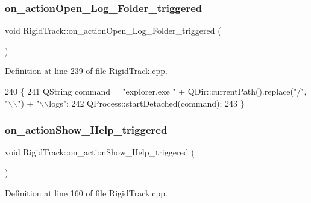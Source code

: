 \subsubsection{\texorpdfstring{on\+\_\+action\+Open\+\_\+\+Log\+\_\+\+Folder\+\_\+triggered}{on\_actionOpen\_Log\_Folder\_triggered}}
{\footnotesize\ttfamily void Rigid\+Track\+::on\+\_\+action\+Open\+\_\+\+Log\+\_\+\+Folder\+\_\+triggered (\begin{DoxyParamCaption}{ }\end{DoxyParamCaption})\hspace{0.3cm}{\ttfamily [slot]}}



Definition at line 239 of file Rigid\+Track.\+cpp.


\begin{DoxyCode}
240 \{
241     QString command = \textcolor{stringliteral}{"explorer.exe "} + QDir::currentPath().replace(\textcolor{stringliteral}{"/"}, \textcolor{stringliteral}{"\(\backslash\)\(\backslash\)"}) + \textcolor{stringliteral}{"\(\backslash\)\(\backslash\)logs"};
242     QProcess::startDetached(command);
243 \}
\end{DoxyCode}
\mbox{\label{class_rigid_track_af14465ac3ad6957b939c63cbae2d7d8c}} 
\subsubsection{\texorpdfstring{on\+\_\+action\+Show\+\_\+\+Help\+\_\+triggered}{on\_actionShow\_Help\_triggered}}
{\footnotesize\ttfamily void Rigid\+Track\+::on\+\_\+action\+Show\+\_\+\+Help\+\_\+triggered (\begin{DoxyParamCaption}{ }\end{DoxyParamCaption})\hspace{0.3cm}{\ttfamily [slot]}}



Definition at line 160 of file Rigid\+Track.\+cpp.



